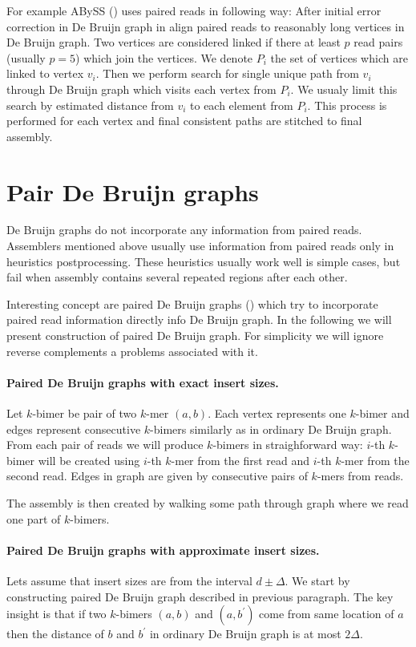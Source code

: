 For example ABySS (\cite{Abyss}) uses paired reads in following way:
After initial error correction in De Bruijn graph in align paired reads
to reasonably long vertices in De Bruijn graph. Two vertices are considered linked
if there at least $p$ read pairs (usually $p=5$) which join the vertices.
We denote $P_i$ the set of vertices which are linked to vertex $v_i$.
Then we perform search for single unique path from $v_i$ through De Bruijn graph which visits
each vertex from $P_i$. We usualy limit this search by estimated distance from $v_i$ to each element
from $P_i$. This process is performed for each vertex and final consistent paths are stitched to final assembly.

\section{Pair De Bruijn graphs}

De Bruijn graphs do not incorporate any information from paired reads.
Assemblers mentioned above usually use information from paired reads only in heuristics postprocessing.
These heuristics usually work well is simple cases, but fail when assembly contains several repeated regions after each other.

Interesting concept are paired De Bruijn graphs (\cite{Paired}) which try to incorporate paired read
information directly info De Bruijn graph. In the following we will present construction of 
paired De Bruijn graph. For simplicity we will ignore reverse complements a problems associated with it.

\paragraph{Paired De Bruijn graphs with exact insert sizes.}
Let $k$-bimer be pair of two $k$-mer $(a, b)$. Each vertex represents one $k$-bimer and edges represent
consecutive $k$-bimers similarly as in ordinary De Bruijn graph. 
From each pair of reads we will produce $k$-bimers in straighforward way:
$i$-th $k$-bimer will be created using $i$-th $k$-mer from the first read and $i$-th $k$-mer from the second read.
Edges in graph are given by consecutive pairs of $k$-mers from reads.

The assembly is then created by walking some path through graph where we read one part of $k$-bimers.

\paragraph{Paired De Bruijn graphs with approximate insert sizes.}
Lets assume that insert sizes are from the interval $d \pm \Delta$.
We start by constructing paired De Bruijn graph described in previous paragraph.
The key insight is that if two $k$-bimers $(a, b)$ and $(a, b^{'})$ come from
same location of $a$ then the distance of $b$ and $b^{'}$ in ordinary De Bruijn graph is at most $2\Delta$.

